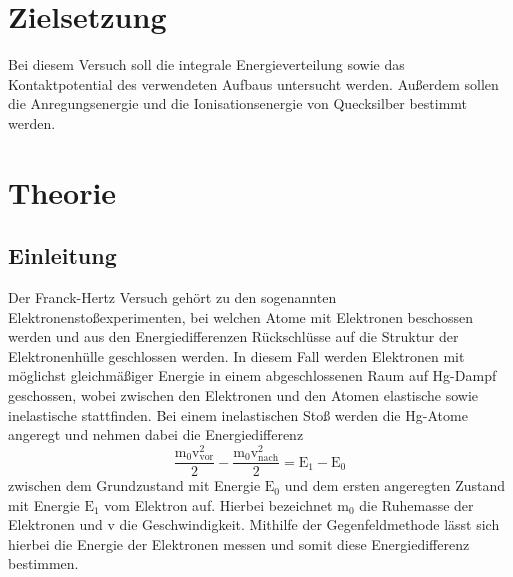 \section{Zielsetzung}
Bei diesem Versuch soll die integrale Energieverteilung sowie das Kontaktpotential des verwendeten
Aufbaus untersucht werden. Außerdem sollen die Anregungsenergie und die Ionisationsenergie von
Quecksilber bestimmt werden.

\section{Theorie}
\subsection{Einleitung}

Der Franck-Hertz Versuch gehört zu den sogenannten Elektronenstoßexperimenten, bei welchen
Atome mit Elektronen beschossen werden und aus den Energiedifferenzen Rückschlüsse auf
die Struktur der Elektronenhülle geschlossen werden.
In diesem Fall werden Elektronen mit möglichst gleichmäßiger Energie in einem abgeschlossenen
Raum auf Hg-Dampf geschossen, wobei zwischen den Elektronen und den Atomen elastische
sowie inelastische stattfinden.
Bei einem inelastischen Stoß werden die Hg-Atome angeregt und nehmen dabei die Energiedifferenz
\begin{equation}
  \frac{\text{m}_0 \text{v}^2_{\text{vor}}}{2} - \frac{\text{m}_0 \text{v}^2_{\text{nach}}}{2} = \text{E}_1 -\text{E}_0
  \label{eqn:Edif}
\end{equation}
zwischen dem Grundzustand mit Energie $\text{E}_0$ und dem ersten angeregten Zustand mit Energie
$\text{E}_1$ vom Elektron auf. Hierbei bezeichnet $\text{m}_0$ die Ruhemasse der Elektronen
und $\text{v}$ die Geschwindigkeit.
Mithilfe der Gegenfeldmethode lässt sich hierbei die Energie der Elektronen messen und
somit diese Energiedifferenz bestimmen.


